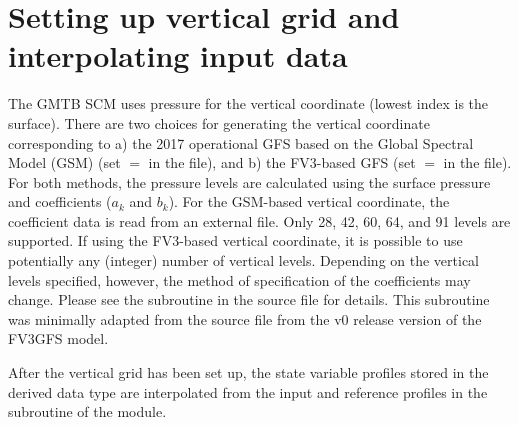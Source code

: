 \section{Setting up vertical grid and interpolating input data}
The GMTB SCM uses pressure for the vertical coordinate (lowest index is the surface). There are two choices for generating the vertical coordinate corresponding to a) the 2017 operational GFS based on the Global Spectral Model (GSM) (set  $=$  in the  file), and b) the FV3-based GFS (set  $=$  in the  file). For both methods, the pressure levels are calculated using the surface pressure and coefficients ($a_k$ and $b_k$). For the GSM-based vertical coordinate, the coefficient data is read from an external file. Only 28, 42, 60, 64, and 91 levels are supported. If using the FV3-based vertical coordinate, it is possible to use potentially any (integer) number of vertical levels. Depending on the vertical levels specified, however, the method of specification of the coefficients may change. Please see the subroutine  in the source file  for details. This subroutine was minimally adapted from the source file  from the v0 release version of the FV3GFS model.

After the vertical grid has been set up, the state variable profiles stored in the  derived data type are interpolated from the input and reference profiles in the  subroutine of the  module.

